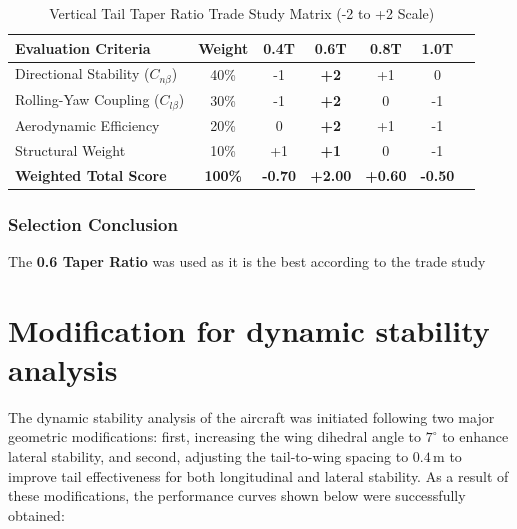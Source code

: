 \documentclass[11pt,a4paper]{article}
\begin{document}
\begin{table}[H]
\centering
\caption{Vertical Tail Taper Ratio Trade Study Matrix (-2 to +2 Scale)}
\begin{tabular}{lcccccc}
\toprule
\textbf{Evaluation Criteria} & \textbf{Weight} & \textbf{0.4T} & \textbf{0.6T} & \textbf{0.8T} & \textbf{1.0T} \\
\midrule
Directional Stability ($C_{n\beta}$) & 40\% & -1 & \textbf{+2} & +1 & 0 \\
Rolling-Yaw Coupling ($C_{l\beta}$) & 30\% & -1 & \textbf{+2} & 0 & -1 \\
Aerodynamic Efficiency & 20\% & 0 & \textbf{+2} & +1 & -1 \\
Structural Weight & 10\% & +1 & \textbf{+1} & 0 & -1 \\
\midrule
\textbf{Weighted Total Score} & \textbf{100\%} & \textbf{-0.70} & \textbf{+2.00} & \textbf{+0.60} & \textbf{-0.50} \\
\bottomrule
\end{tabular}
\end{table}


\subsubsection{Selection Conclusion}
The \textbf{0.6 Taper Ratio} was used as it is the best according to the trade study

\section{Modification for dynamic stability analysis}
The dynamic stability analysis of the aircraft was initiated following two major geometric modifications: first, increasing the wing dihedral angle to $7^\circ$ to enhance lateral stability, and second, adjusting the tail-to-wing spacing to $0.4\,\text{m}$ to improve tail effectiveness for both longitudinal and lateral stability. As a result of these modifications, the performance curves shown below were successfully obtained:
\end{document}
